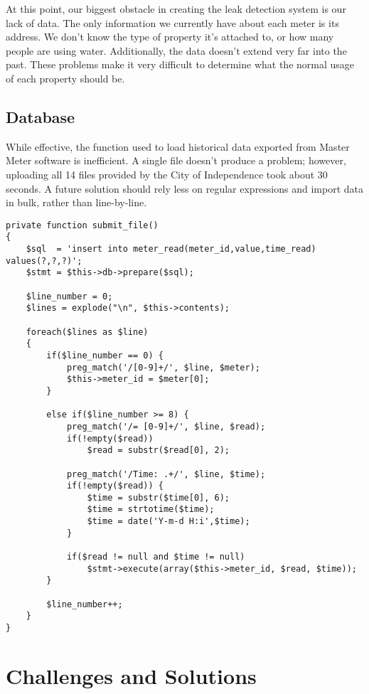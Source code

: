 \documentclass[journal]{IEEEtran}
\begin{document}
At this point, our biggest obstacle in creating the leak detection system is our lack of data. The only information we currently have about each meter is its address. We don't know the type of property it's attached to, or how many people are using water. Additionally, the data doesn't extend very far into the past. These problems make it very difficult to determine what the normal usage of each property should be.

\subsection{Database}
While effective, the function used to load historical data exported from Master Meter software is inefficient. A single file doesn't produce a problem; however, uploading all 14 files provided by the City of Independence took about 30 seconds. A future solution should rely less on regular expressions and import data in bulk, rather than line-by-line.

\begin{lstlisting}
private function submit_file()
{
    $sql  = 'insert into meter_read(meter_id,value,time_read) values(?,?,?)';
    $stmt = $this->db->prepare($sql);

    $line_number = 0;
    $lines = explode("\n", $this->contents);

    foreach($lines as $line) 
    {
        if($line_number == 0) {
            preg_match('/[0-9]+/', $line, $meter);
            $this->meter_id = $meter[0];
        }

        else if($line_number >= 8) {
            preg_match('/= [0-9]+/', $line, $read);
            if(!empty($read))
                $read = substr($read[0], 2);

            preg_match('/Time: .+/', $line, $time);
            if(!empty($read)) {
                $time = substr($time[0], 6);
                $time = strtotime($time);
                $time = date('Y-m-d H:i',$time);
            }

            if($read != null and $time != null)
                $stmt->execute(array($this->meter_id, $read, $time));
        }

        $line_number++;
    }
}
\end{lstlisting}

\section{Challenges and Solutions}
\end{document}
